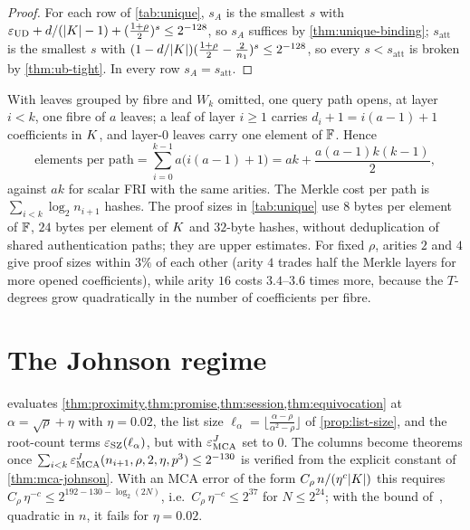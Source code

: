 \begin{proof}
For each row of \cref{tab:unique}, $s_A$ is the smallest $s$ with
$\varepsilon_{\mathrm{UD}}+d/(|K|-1)+(\frac{1+\rho}2)^s\le2^{-128}$, so $s_A$ suffices by
\cref{thm:unique-binding}; $s_{\mathrm{att}}$ is the smallest $s$ with
$(1-d/|K|)(\frac{1+\rho}2-\frac2{n_1})^s\le2^{-128}$, so every $s<s_{\mathrm{att}}$ is
broken by \cref{thm:ub-tight}. In every row $s_A=s_{\mathrm{att}}$.
\end{proof}

\begin{remark}\label{rem:cost}
With leaves grouped by fibre and $W_k$ omitted, one query path opens, at layer $i<k$, one
fibre of $a$ leaves; a leaf of layer $i\ge1$ carries $d_i+1=i(a-1)+1$ coefficients in
$K$, and layer-$0$ leaves carry one element of $\mathbb{F}$. Hence
\[
\text{elements per path}=\sum_{i=0}^{k-1}a\bigl(i(a-1)+1\bigr)=ak+\frac{a(a-1)k(k-1)}2,
\]
against $ak$ for scalar FRI with the same arities. The Merkle cost per path is
$\sum_{i<k}\log_2n_{i+1}$ hashes. The proof sizes in \cref{tab:unique} use $8$ bytes per
element of $\mathbb{F}$, $24$ bytes per element of $K$ and $32$-byte hashes, without
deduplication of shared authentication paths; they are upper estimates.
For fixed $\rho$, arities $2$ and $4$ give proof sizes within $3\%$ of each other (arity
$4$ trades half the Merkle layers for more opened coefficients), while arity $16$ costs
$3.4$--$3.6$ times more, because the $T$-degrees grow quadratically in the number of
coefficients per fibre.
\end{remark}

\section{The Johnson regime}

\begin{remark}\label{rem:johnson-provisional}
 evaluates \cref{thm:proximity,thm:promise,thm:session,thm:equivocation}
at $\alpha=\sqrt\rho+\eta$ with $\eta=0.02$, the list size
$\ell_\alpha=\lfloor\frac{\alpha-\rho}{\alpha^2-\rho}\rfloor$ of
\cref{prop:list-size}, and the root-count terms $\varepsilon_{\mathrm{SZ}}(\ell_\alpha)$, but with
$\varepsilon^J_{\mathrm{MCA}}$ set to $0$. The columns become theorems once
$\sum_{i<k}\varepsilon^J_{\mathrm{MCA}}(n_{i+1},\rho,2,\eta,p^3)\le2^{-130}$ is verified from the explicit
constant of \cref{thm:mca-johnson}. With an MCA error of the form
$C_\rho\,n/(\eta^{c}|K|)$ this requires
$C_\rho\,\eta^{-c}\le2^{192-130-\log_2(2N)}$, i.e.\ $C_\rho\,\eta^{-c}\le2^{37}$ for
$N\le2^{24}$; with the bound of~\cite{BCIKS20}, quadratic in $n$, it fails for $\eta=0.02$.
\end{remark}

